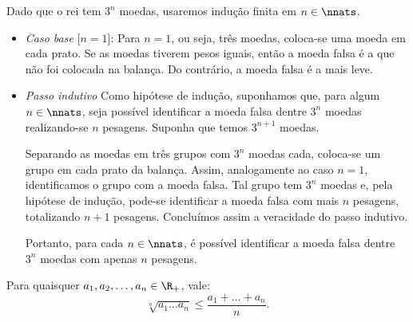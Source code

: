 \begin{solution}
Dado que o rei tem $3^n$ moedas, usaremos indução finita em $n \in \nnats$. 

\begin{itemize}
	\item \textit{Caso base} [$n=1$]: Para $n=1$, ou seja, três moedas, coloca-se uma moeda em cada prato. Se as moedas tiverem pesos iguais, então a moeda falsa é a que não foi colocada na balança. Do contrário, a moeda falsa é a mais leve.

	\item \textit{Passo indutivo} Como hipótese de indução, suponhamos que, para algum $n \in \nnats$, seja possível identificar a moeda falsa dentre $3^n$ moedas realizando-se $n$ pesagens. Suponha que temos $3^{n+1}$ moedas. 

	Separando as moedas em três grupos com $3^n$ moedas cada, coloca-se um grupo em cada prato da balança. Assim, analogamente ao caso $n = 1$, identificamos o grupo com a moeda falsa. Tal grupo tem $3^n$ moedas e, pela hipótese de indução, pode-se identificar a moeda falsa com mais $n$  pesagens, totalizando $n+1$ pesagens. Concluímos assim a veracidade do passo indutivo.

		Portanto, para cada $n \in \nnats$, é possível identificar a moeda falsa dentre $3^n$ moedas com apenas $n$ pesagens.
\end{itemize}
\end{solution}

\begin{theorem}
Para quaisquer $a_1, a_2, \dots , a_n \in \R_+$, vale:
%
\begin{equation*}
    \sqrt[n]{a_1\dots a_n} \le \frac {a_1 + \dots + a_n} n.
\end{equation*}
\end{theorem}

